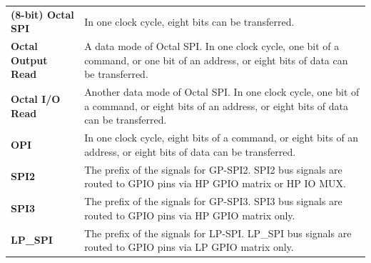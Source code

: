 \begin{longtable}[c]{ R{7cm} p{10cm} }
\textbf{(8-bit) Octal SPI} & In one clock cycle, eight bits can be transferred. \\
\textbf{Octal Output Read} & A data mode of Octal SPI. In one clock cycle, one bit of a command, or one bit of an address, or eight bits of data can be transferred.\\
\textbf{Octal I/O Read} & Another data mode of Octal SPI. In one clock cycle, one bit of a command, or eight bits of an address, or eight bits of data can be transferred.\\
\textbf{OPI} & In one clock cycle, eight bits of a command, or eight bits of an address, or eight bits of data can be transferred.\\
\textbf{SPI2} & The prefix of the signals for GP-SPI2. SPI2 bus signals are routed to GPIO pins via HP GPIO matrix or HP IO MUX.\\
\textbf{SPI3} & The prefix of the signals for GP-SPI3. SPI3 bus signals are routed to GPIO pins via HP GPIO matrix only.\\
\textbf{LP\_SPI} & The prefix of the signals for LP-SPI. LP\_SPI bus signals are routed to GPIO pins via LP GPIO matrix only.
\end{longtable}
